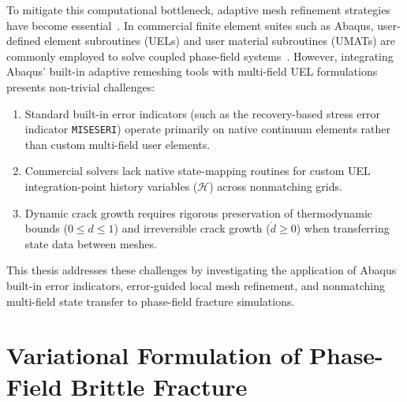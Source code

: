 To mitigate this computational bottleneck, adaptive mesh refinement strategies have become essential~\cite{badnava2020,nagaraja2019}. In commercial finite element suites such as Abaqus, user-defined element subroutines (UELs) and user material subroutines (UMATs) are commonly employed to solve coupled phase-field systems~\cite{molnar2017,msekh2015,diddige2025}. However, integrating Abaqus' built-in adaptive remeshing tools with multi-field UEL formulations presents non-trivial challenges:
\begin{enumerate}
    \item Standard built-in error indicators (such as the recovery-based stress error indicator \texttt{MISESERI}) operate primarily on native continuum elements rather than custom multi-field user elements.
    \item Commercial solvers lack native state-mapping routines for custom UEL integration-point history variables ($\mathcal{H}$) across nonmatching grids.
    \item Dynamic crack growth requires rigorous preservation of thermodynamic bounds ($0 \le d \le 1$) and irreversible crack growth ($\dot{d} \ge 0$) when transferring state data between meshes.
\end{enumerate}

This thesis addresses these challenges by investigating the application of Abaqus built-in error indicators, error-guided local mesh refinement, and nonmatching multi-field state transfer to phase-field fracture simulations.

\section{Variational Formulation of Phase-Field Brittle Fracture}
\label{sec:theory_phasefield}

